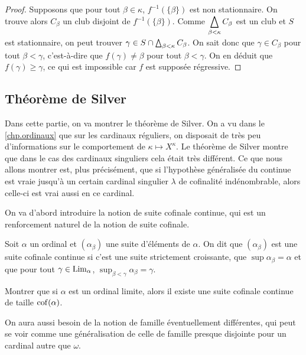 \begin{proof}
  Supposons que pour tout $\beta \in \kappa$, $f^{-1}(\{\beta\})$ est non
  stationnaire. On trouve alors $C_\beta$ un club disjoint de
  $f^{-1}(\{\beta\})$. Comme $\displaystyle\bigtriangleup_{\beta < \kappa} C_\beta$ est un
  club et $S$ est stationnaire, on peut trouver
  $\gamma \in S\cap \bigtriangleup_{\beta < \kappa} C_\beta$. On sait donc que
  $\gamma \in C_\beta$ pour tout $\beta < \gamma$, c'est-à-dire que
  $f(\gamma) \neq \beta$ pour tout $\beta < \gamma$. On en déduit que
  $f(\gamma) \geq \gamma$, ce qui est impossible car $f$ est supposée
  régressive.
\end{proof}

\subsection{Théorème de Silver}

Dans cette partie, on va montrer le théorème de Silver. On a vu dans le
\cref{chp.ordinaux} que sur les cardinaux réguliers, on disposait de très peu
d'informations sur le comportement de $\kappa \mapsto X^\kappa$. Le théorème de
Silver montre que dans le cas des cardinaux singuliers cela était très
différent. Ce que nous allons montrer est, plus précisément, que si l'hypothèse
généralisée du continue est vraie jusqu'à un certain cardinal singulier
$\lambda$ de cofinalité indénombrable, alors celle-ci est vrai aussi en ce
cardinal.

On va d'abord introduire la notion de suite cofinale continue, qui est un
renforcement naturel de la notion de suite cofinale.

\begin{definition}
  Soit $\alpha$ un ordinal et $(\alpha_\beta)$ une suite d'éléments de $\alpha$.
  On dit que $(\alpha_\beta)$ est une suite cofinale continue si c'est une
  suite strictement croissante, que $\sup\alpha_\beta = \alpha$ et que pour
  tout $\gamma \in\operatorname{Lim}_\alpha$, $\sup_{\beta < \gamma} \alpha_\beta = \gamma$.
\end{definition}

\begin{exercise}
  Montrer que si $\alpha$ est un ordinal limite, alors il existe une suite
  cofinale continue de taille $\operatorname{cof}(\alpha)$.
\end{exercise}

On aura aussi besoin de la notion de famille éventuellement différentes, qui
peut se voir comme une généralisation de celle de famille presque disjointe pour
un cardinal autre que $\omega$.

